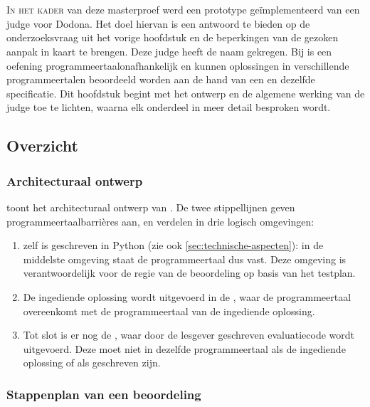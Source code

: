 \chapter{\tested{}}\label{ch:tested}

\lettrine{I}{n het kader} van deze masterproef werd een prototype geïmplementeerd van een judge voor Dodona.
Het doel hiervan is een antwoord te bieden op de onderzoeksvraag uit het vorige hoofdstuk en de beperkingen van de gezoken aanpak in kaart te brengen.
Deze judge heeft de naam \term{\tested{}} gekregen.
Bij \tested{} is een oefening programmeertaalonafhankelijk en kunnen oplossingen in verschillende programmeertalen beoordeeld worden aan de hand van een en dezelfde specificatie.
Dit hoofdstuk begint met het ontwerp en de algemene werking van de judge toe te lichten, waarna elk onderdeel in meer detail besproken wordt.

\section{Overzicht}\label{sec:ontwerp}

\subsection{Architecturaal ontwerp}\label{subsec:architecturaal-overzicht}

 toont het architecturaal ontwerp van \tested{}.
De twee stippellijnen geven programmeertaalbarrières aan, en verdelen \tested{} in drie logisch omgevingen:

\begin{enumerate}
    \item \tested{} zelf is geschreven in Python (zie ook \cref{sec:technische-aspecten}): in de middelste omgeving staat de programmeertaal dus vast.
    Deze omgeving is verantwoordelijk voor de regie van de beoordeling op basis van het testplan.
    \item De ingediende oplossing wordt uitgevoerd in de , waar de programmeertaal overeenkomt met de programmeertaal van de ingediende oplossing.
    \item Tot slot is er nog de , waar door de lesgever geschreven evaluatiecode wordt uitgevoerd.
    Deze moet niet in dezelfde programmeertaal als de ingediende oplossing of als \tested{} geschreven zijn.
\end{enumerate}

\subsection{Stappenplan van een beoordeling}\label{subsec:stappenplan-van-een-beoordeling}

